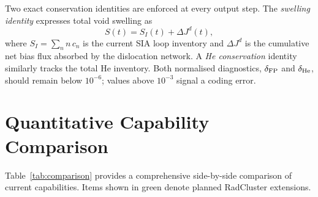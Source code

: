 \documentclass[12pt,letterpaper]{article}
\begin{document}
Two exact conservation identities are enforced at every output step.
The \emph{swelling identity} expresses total void swelling as
\begin{equation}
  S(t) = S_I(t) + \Delta J^d(t),
\end{equation}
where $S_I = \sum_n n\,c_n$ is the current SIA loop inventory and
$\Delta J^d$ is the cumulative net bias flux absorbed by the dislocation
network.  A \emph{He conservation} identity similarly tracks the total
He inventory.  Both normalised diagnostics, $\delta_{\rm FP}$ and
$\delta_{\rm He}$, should remain below $10^{-6}$; values above $10^{-3}$
signal a coding error.

\section{Quantitative Capability Comparison}
\label{sec:table}

Table~\ref{tab:comparison} provides a comprehensive side-by-side
comparison of current capabilities.  Items shown in
{\color{plancolor}green} denote planned RadCluster extensions.
\end{document}
